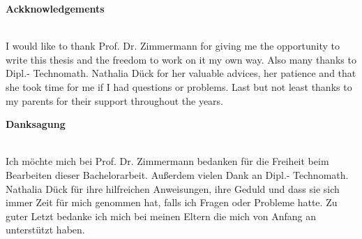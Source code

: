 

\begin{center}
\large \textbf{Ackknowledgements} \\
~\\ %


\end{center}
I would like to thank Prof. Dr. Zimmermann for giving me the opportunity to write this thesis and the freedom to work on it my own way. Also many thanks to Dipl.- Technomath. Nathalia Dück for her valuable advices, her patience and that she took time for me if I had questions or problems. Last but not least thanks to my parents for their support throughout the years. 

\vfill %
\begin{center}
\large \textbf{Danksagung} \\
~\\ %
\end{center}
Ich möchte mich bei Prof. Dr. Zimmermann bedanken für die Freiheit beim Bearbeiten dieser Bachelorarbeit. Außerdem vielen Dank an Dipl.- Technomath. Nathalia Dück für ihre hilfreichen Anweisungen, ihre Geduld und dass sie sich immer Zeit für mich genommen hat, falls ich Fragen oder Probleme hatte. Zu guter Letzt bedanke ich mich bei meinen Eltern die mich von Anfang an unterstützt haben.